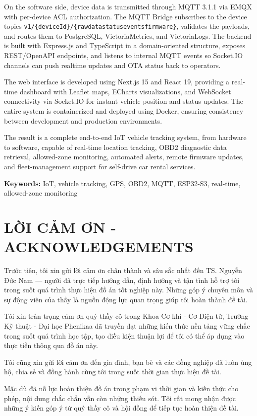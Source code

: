 \documentclass[a4paper]{extarticle}
\newcommand{\majorheading}[1]{%
  \clearpage
  \phantomsection
  \section*{#1}%
  \addcontentsline{toc}{section}{#1}%
}
\begin{document}
On the software side, device data is transmitted through MQTT 3.1.1 via
EMQX with per-device ACL authorization. The MQTT Bridge subscribes to
the device topics
\texttt{v1/\{deviceId\}/\{rawdata\textbar status\textbar events\textbar firmware\}},
validates the payloads, and routes them to PostgreSQL, VictoriaMetrics,
and VictoriaLogs. The backend is built with Express.js and TypeScript in
a domain-oriented structure, exposes REST/OpenAPI endpoints, and listens
to internal MQTT events so Socket.IO channels can push realtime updates
and OTA status back to operators.

The web interface is developed using Next.js 15 and React 19, providing
a real-time dashboard with Leaflet maps, ECharts visualizations, and
WebSocket connectivity via Socket.IO for instant vehicle position and
status updates. The entire system is containerized and deployed using
Docker, ensuring consistency between development and production
environments.

The result is a complete end-to-end IoT vehicle tracking system, from
hardware to software, capable of real-time location tracking, OBD2
diagnostic data retrieval, allowed-zone monitoring, automated alerts,
remote firmware updates, and fleet-management support for self-drive car
rental services.

\textbf{Keywords:} IoT, vehicle tracking, GPS, OBD2, MQTT, ESP32-S3,
real-time, allowed-zone monitoring

\majorheading{LỜI CẢM ƠN - ACKNOWLEDGEMENTS}\label{lux1eddi-cux1ea3m-ux1a1n---acknowledgements}

Trước tiên, tôi xin gửi lời cảm ơn chân thành và sâu sắc nhất đến TS.
Nguyễn Đức Nam --- người đã trực tiếp hướng dẫn, định hướng và tận tình
hỗ trợ tôi trong suốt quá trình thực hiện đồ án tốt nghiệp này. Những
góp ý chuyên môn và sự động viên của thầy là nguồn động lực quan trọng
giúp tôi hoàn thành đề tài.

Tôi xin trân trọng cảm ơn quý thầy cô trong Khoa Cơ khí - Cơ Điện tử,
Trường Kỹ thuật - Đại học Phenikaa đã truyền đạt những kiến thức nền
tảng vững chắc trong suốt quá trình học tập, tạo điều kiện thuận lợi để
tôi có thể áp dụng vào thực tiễn thông qua đồ án này.

Tôi cũng xin gửi lời cảm ơn đến gia đình, bạn bè và các đồng nghiệp đã
luôn ủng hộ, chia sẻ và đồng hành cùng tôi trong suốt thời gian thực
hiện đề tài.

Mặc dù đã nỗ lực hoàn thiện đồ án trong phạm vi thời gian và kiến thức
cho phép, nội dung chắc chắn vẫn còn những thiếu sót. Tôi rất mong nhận
được những ý kiến góp ý từ quý thầy cô và hội đồng để tiếp tục hoàn
thiện đề tài.
\end{document}
